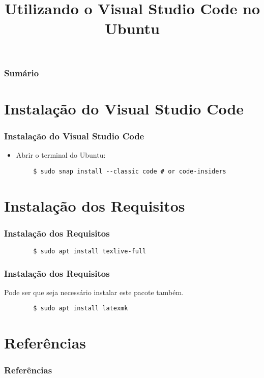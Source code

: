\documentclass[brazilian]{beamer}
\title{Utilizando o Visual Studio Code no Ubuntu}
\begin{document}
\frame{\titlepage}

\begin{frame}
    \frametitle{Sumário}
    \tableofcontents
\end{frame}

\section{Instalação do Visual Studio Code}

\begin{frame}[fragile]
    \frametitle{Instalação do Visual Studio Code}
    \begin{itemize}
        \item Abrir o terminal do Ubuntu: 
    \end{itemize}
    \begin{lstlisting}
        $ sudo snap install --classic code # or code-insiders
    \end{lstlisting}
\end{frame}


\section{Instalação dos Requisitos}
\begin{frame}[fragile]
    \frametitle{Instalação dos Requisitos}
    \begin{lstlisting}
        $ sudo apt install texlive-full
    \end{lstlisting}
\end{frame}

\begin{frame}[fragile]
    \frametitle{Instalação dos Requisitos}
    Pode ser que seja necessário instalar este pacote também.
    \begin{lstlisting}
        $ sudo apt install latexmk
    \end{lstlisting}
\end{frame}

\section{Referências}

\begin{frame}[allowframebreaks]
    \frametitle{Referências}
    \nocite{TeXLiveUbuntu,VisualStudioCodeUbuntu}
    \printbibliography[]
\end{frame}
\end{document}
